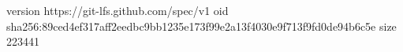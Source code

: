 version https://git-lfs.github.com/spec/v1
oid sha256:89ced4ef317aff2eedbc9bb1235e173f99e2a13f4030e9f713f9fd0de94b6c5e
size 223441
